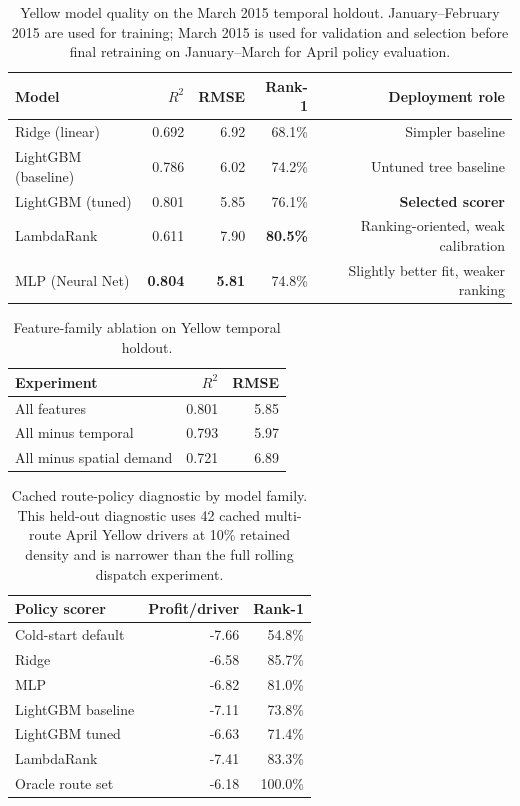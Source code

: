 \documentclass[journal]{IEEEtran}
\begin{document}
\begin{table}[!t]
\caption{Yellow model quality on the March 2015 temporal holdout. January--February 2015 are used for training; March 2015 is used for validation and selection before final retraining on January--March for April policy evaluation.}
\label{tab:model_quality}
\centering
\scriptsize
\setlength{\tabcolsep}{2.5pt}
\begin{tabular}{|l|r|r|r|r|}
\hline
Model & \(R^2\) & RMSE & Rank-1 & Deployment role \\
\hline
Ridge (linear) & 0.692 & 6.92 & 68.1\% & Simpler baseline \\
\hline
LightGBM (baseline) & 0.786 & 6.02 & 74.2\% & Untuned tree baseline \\
\hline
LightGBM (tuned) & 0.801 & 5.85 & 76.1\% & \textbf{Selected scorer} \\
\hline
LambdaRank & 0.611 & 7.90 & \textbf{80.5\%} & Ranking-oriented, weak calibration \\
\hline
MLP (Neural Net) & \textbf{0.804} & \textbf{5.81} & 74.8\% & Slightly better fit, weaker ranking \\
\hline
\end{tabular}
\end{table}

\begin{table}[!t]
\caption{Feature-family ablation on Yellow temporal holdout.}
\label{tab:model_ablation}
\centering
\scriptsize
\setlength{\tabcolsep}{4.0pt}
\begin{tabular}{|l|r|r|}
\hline
Experiment & \(R^2\) & RMSE \\
\hline
All features & 0.801 & 5.85 \\
\hline
All minus temporal & 0.793 & 5.97 \\
\hline
All minus spatial demand & 0.721 & 6.89 \\
\hline
\end{tabular}
\end{table}

\begin{table}[!t]
\caption{Cached route-policy diagnostic by model family. This held-out diagnostic uses 42 cached multi-route April Yellow drivers at 10\% retained density and is narrower than the full rolling dispatch experiment.}
\label{tab:model_policy_diagnostic}
\centering
\scriptsize
\setlength{\tabcolsep}{3.0pt}
\begin{tabular}{|l|r|r|}
\hline
Policy scorer & Profit/driver & Rank-1 \\
\hline
Cold-start default & -7.66 & 54.8\% \\
\hline
Ridge & -6.58 & 85.7\% \\
\hline
MLP & -6.82 & 81.0\% \\
\hline
LightGBM baseline & -7.11 & 73.8\% \\
\hline
LightGBM tuned & -6.63 & 71.4\% \\
\hline
LambdaRank & -7.41 & 83.3\% \\
\hline
Oracle route set & -6.18 & 100.0\% \\
\hline
\end{tabular}
\end{table}
\end{document}
